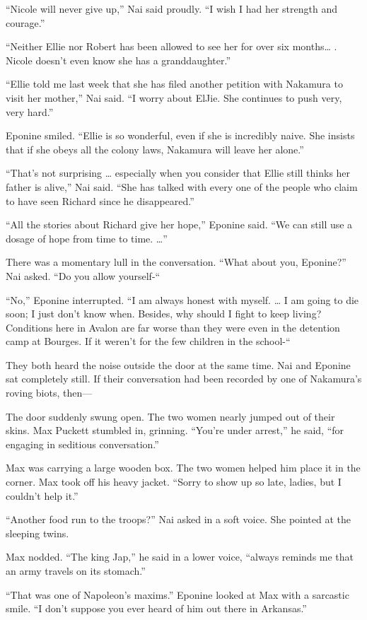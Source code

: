 \documentclass[]{article}
\begin{document}
{{“Nicole will never give up,” Nai said proudly. “I wish I had her strength and courage.”

“Neither Ellie nor Robert has been allowed to see her for over six months… . Nicole doesn’t even know she has a granddaughter.”

“Ellie told me last week that she has filed another petition with Nakamura to visit her mother,” Nai said. “I worry about ElJie. She continues to push very, very hard.”

Eponine smiled. “Ellie is so wonderful, even if she is incredibly naive. She insists that if she obeys all the colony laws, Nakamura will leave her alone.”

“That’s not surprising … especially when you consider that Ellie still thinks her father is alive,” Nai said. “She has talked with every one of the people who claim to have seen Richard since he disappeared.”

“All the stories about Richard give her hope,” Eponine said. “We can still use a dosage of hope from time to time. …”

There was a momentary lull in the conversation. “What about you, Eponine?” Nai asked. “Do you allow yourself-“

“No,” Eponine interrupted. “I am always honest with myself. … I am going to die soon; I just don’t know when. Besides, why should I fight to keep living? Conditions here in Avalon are far worse than they were even in the detention camp at Bourges. If it weren’t for the few children in the school-“

They both heard the noise outside the door at the same time. Nai and Eponine sat completely still. If their conversation had been recorded by one of Nakamura’s roving biots, then—

The door suddenly swung open. The two women nearly jumped out of their skins. Max Puckett stumbled in, grinning. “You’re under arrest,” he said, “for engaging in seditious conversation.”

Max was carrying a large wooden box. The two women helped him place it in the corner. Max took off his heavy jacket. “Sorry to show up so late, ladies, but I couldn’t help it.”

“Another food run to the troops?” Nai asked in a soft voice. She pointed at the sleeping twins.

Max nodded. “The king Jap,” he said in a lower voice, “always reminds me that an army travels on its stomach.”

“That was one of Napoleon’s maxims.” Eponine looked at Max with a sarcastic smile. “I don’t suppose you ever heard of him out there in Arkansas.”

}}
\end{document}
